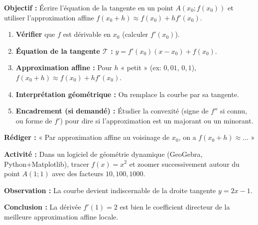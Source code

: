 \documentclass[11pt]{article}
\begin{document}
\begin{methode}
\textbf{Objectif :} Écrire l'équation de la tangente en un point $A(x_0; f(x_0))$ et utiliser l'approximation affine $f(x_0+h) \approx f(x_0) + h f'(x_0)$.
\begin{enumerate}
    \item \textbf{Vérifier} que $f$ est dérivable en $x_0$ (calculer $f'(x_0)$).
    \item \textbf{Équation de la tangente $\mathcal{T}$ :} $y = f'(x_0)(x - x_0) + f(x_0)$.
    \item \textbf{Approximation affine :} Pour $h$ « petit » (ex: $0,01$, $0,1$), $f(x_0+h) \approx f(x_0) + h f'(x_0)$.
    \item \textbf{Interprétation géométrique :} On remplace la courbe par sa tangente.
    \item \textbf{Encadrement (si demandé) :} Étudier la convexité (signe de $f''$ si connu, ou forme de $f'$) pour dire si l'approximation est un majorant ou un minorant.
\end{enumerate}
\textbf{Rédiger :} « Par approximation affine au voisinage de $x_0$, on a $f(x_0+h) \approx \dots$ »
\end{methode}

\begin{experience}
\textbf{Activité :} Dans un logiciel de géométrie dynamique (GeoGebra, Python+Matplotlib), tracer $f(x)=x^2$ et zoomer successivement autour du point $A(1;1)$ avec des facteurs $10, 100, 1000$.
\par
\textbf{Observation :} La courbe devient indiscernable de la droite tangente $y=2x-1$.
\par
\textbf{Conclusion :} La dérivée $f'(1)=2$ est bien le coefficient directeur de la meilleure approximation affine locale.
\end{experience}
\end{document}
